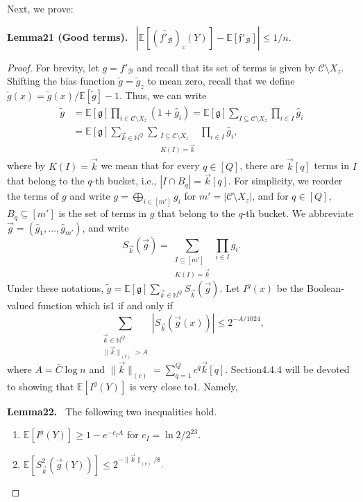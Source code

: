 \documentclass[10pt,a4paper]{article}
\newenvironment{authorclaim}[1]{\par\medskip\noindent\textbf{#1.}\ \ignorespaces}{\par\medskip}
\begin{document}
Next, we prove:
\begin{authorclaim}{Lemma21 (Good terms)}
$|\mathbb E[(\widetilde{f'_{\mathcal B}})_z(Y)]-\mathbb E[\mathfrak f'_{\mathcal B}]|\le1/n$.
\end{authorclaim}
\begin{proof}
For brevity, let $g=f'_{\mathcal B}$ and recall that its set of terms is given by $\mathcal C\setminus X_z$. Shifting the bias function $\widetilde g=\widetilde g_z$ to mean zero, recall that we define $\check g(x)=\widetilde g(x)/\mathbb E[\widetilde g]-1$.
Thus, we can write
\begin{align*}
\widetilde g
&=\mathbb E[\mathfrak g]\prod_{i\in\mathcal C\setminus X_z}(1+\widehat g_i)
=\mathbb E[\mathfrak g]\sum_{I\subseteq\mathcal C\setminus X_z}\prod_{i\in I}\widehat g_i\\
&=\mathbb E[\mathfrak g]\sum_{\vec k\in\mathbb N^Q}
\sum_{\substack{I\subseteq\mathcal C\setminus X_z\\K(I)=\vec k}}\prod_{i\in I}\widehat g_i,
\end{align*}
where by $K(I)=\vec k$ we mean that for every $q\in[Q]$, there are $\vec k[q]$ terms in $I$ that belong to the $q$-th bucket, i.e., $|I\cap B_q|=\vec k[q]$. For simplicity, we reorder the terms of $g$ and write $g=\bigoplus_{i\in[m']}g_i$ for $m'=|\mathcal C\setminus X_z|$, and for $q\in[Q]$, $B_q\subseteq[m']$ is the set of terms in $g$ that belong to the $q$-th bucket. We abbreviate $\vec g=(\widehat g_1,\ldots,\widehat g_{m'})$, and write
\[
S_{\vec k}(\vec g)=\sum_{\substack{I\subseteq[m']\\K(I)=\vec k}}\prod_{i\in I}\widehat g_i.
\]
Under these notations, $\widetilde g=\mathbb E[\mathfrak g]\sum_{\vec k\in\mathbb N^Q}S_{\vec k}(\vec g)$.
Let $I^g(x)$ be the Boolean-valued function which is1 if and only if
\[
\sum_{\substack{\vec k\in\mathbb N^Q\\\|\vec k\|_{(c)}>A}}|S_{\vec k}(\vec g(x))|\le2^{-A/1024},
\]
where $A=\bar C\log n$ and $\|\vec k\|_{(c)}=\sum_{q=1}^Qc^q\vec k[q]$. Section4.4.4 will be devoted to showing that $\mathbb E[I^g(Y)]$ is very close to1. Namely,
\begin{authorclaim}{Lemma22}
The following two inequalities hold.
\begin{enumerate}
\item $\mathbb E[I^g(Y)]\ge1-e^{-c_IA}$ for $c_I=\ln2/2^{23}$.
\item $\mathbb E[S_{\vec k}^2(\vec g(Y))]\le2^{-\|\vec k\|_{(c)}/8}$.
\end{enumerate}
\end{authorclaim}

\end{proof}
\end{document}
